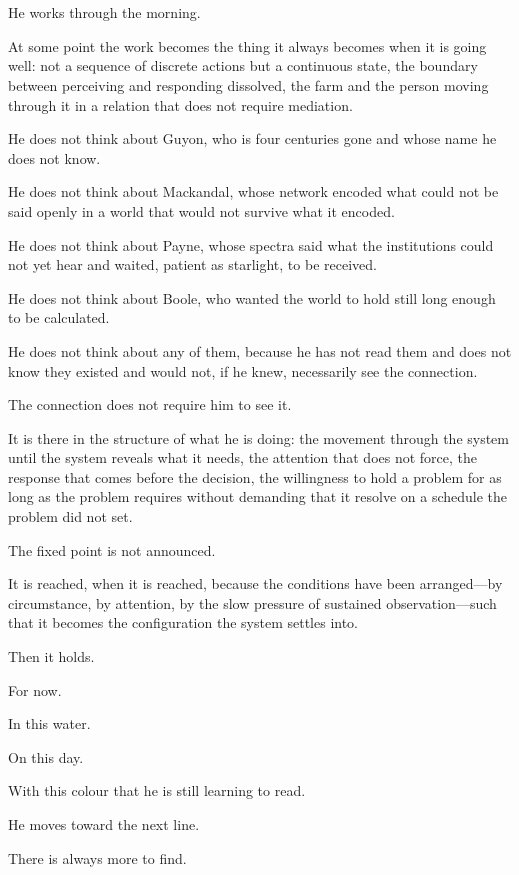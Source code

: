 \section{}

He works through the morning.

At some point the work becomes the thing it
always becomes when it is going well: not a
sequence of discrete actions but a continuous
state, the boundary between perceiving and
responding dissolved, the farm and the person
moving through it in a relation that does not
require mediation.

He does not think about Guyon, who is four
centuries gone and whose name he does not know.

He does not think about Mackandal, whose
network encoded what could not be said openly
in a world that would not survive what it encoded.

He does not think about Payne, whose spectra
said what the institutions could not yet hear
and waited, patient as starlight, to be received.

He does not think about Boole, who wanted the
world to hold still long enough to be calculated.

He does not think about any of them, because
he has not read them and does not know they
existed and would not, if he knew, necessarily
see the connection.

The connection does not require him to see it.

It is there in the structure of what he is doing:
the movement through the system until the system
reveals what it needs, the attention that does
not force, the response that comes before the
decision, the willingness to hold a problem for
as long as the problem requires without demanding
that it resolve on a schedule the problem did not
set.

The fixed point is not announced.

It is reached, when it is reached, because the
conditions have been arranged---by circumstance,
by attention, by the slow pressure of sustained
observation---such that it becomes the configuration
the system settles into.

Then it holds.

For now.

In this water.

On this day.

With this colour that he is still learning to read.

He moves toward the next line.

There is always more to find.

